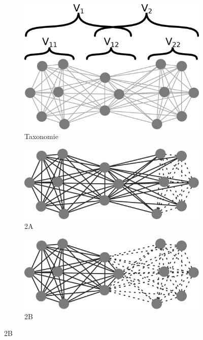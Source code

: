 \begin{figure}[h]
\centering
	\begin{subfigure}[b]{0.3\linewidth}
		\includegraphics[width=\linewidth]{img/ExpectedNodes/2Cliques/PartitionExamples/Clique2}
		\caption{Taxonomie\label{fig:2Ctaxo}}	
	\end{subfigure}	
	\begin{subfigure}[b]{0.3\linewidth}
		\includegraphics[width=\linewidth]{img/ExpectedNodes/2Cliques/PartitionExamples/Clique2A}
		\caption{2A\label{fig:2C2A}}	
	\end{subfigure}	
	\begin{subfigure}[b]{0.3\linewidth}
			\includegraphics[width=\linewidth]{img/ExpectedNodes/2Cliques/PartitionExamples/Clique2B}
			\caption{2B\label{fig:2C2B}}		
	\end{subfigure}


\end{figure}
